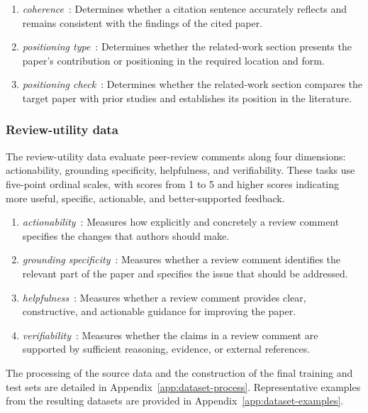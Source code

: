 \begin{enumerate}
    \renewcommand{\labelenumi}{(\arabic{enumi})}

    \item \textit{coherence}~\citep{sahinuc-etal-2025-related-work}:
    Determines whether a citation sentence accurately reflects and remains
    consistent with the findings of the cited paper.

    \item \textit{positioning type}~\citep{sahinuc-etal-2025-related-work}:
    Determines whether the related-work section presents the paper's
    contribution or positioning in the required location and form.

    \item \textit{positioning check}~\citep{sahinuc-etal-2025-related-work}:
    Determines whether the related-work section compares the target paper
    with prior studies and establishes its position in the literature.

\end{enumerate}

\subsubsection*{Review-utility data}

The review-utility data evaluate peer-review comments along four dimensions:
actionability, grounding specificity, helpfulness, and verifiability. These
tasks use five-point ordinal scales, with scores from 1 to 5 and higher scores
indicating more useful, specific, actionable, and better-supported feedback.

\begin{enumerate}
    \renewcommand{\labelenumi}{(\arabic{enumi})}

    \item \textit{actionability}~\citep{sadallah-etal-2025-good}: Measures
    how explicitly and concretely a review comment specifies the changes that
    authors should make.

    \item \textit{grounding specificity}~\citep{sadallah-etal-2025-good}:
    Measures whether a review comment identifies the relevant part of the
    paper and specifies the issue that should be addressed.

    \item \textit{helpfulness}~\citep{sadallah-etal-2025-good}: Measures
    whether a review comment provides clear, constructive, and actionable
    guidance for improving the paper.

    \item \textit{verifiability}~\citep{sadallah-etal-2025-good}: Measures
    whether the claims in a review comment are supported by sufficient
    reasoning, evidence, or external references.

\end{enumerate}

The processing of the source data and the construction of the final training
and test sets are detailed in Appendix~\ref{app:dataset-process}.
Representative examples from the resulting datasets are provided in
Appendix~\ref{app:dataset-examples}.

